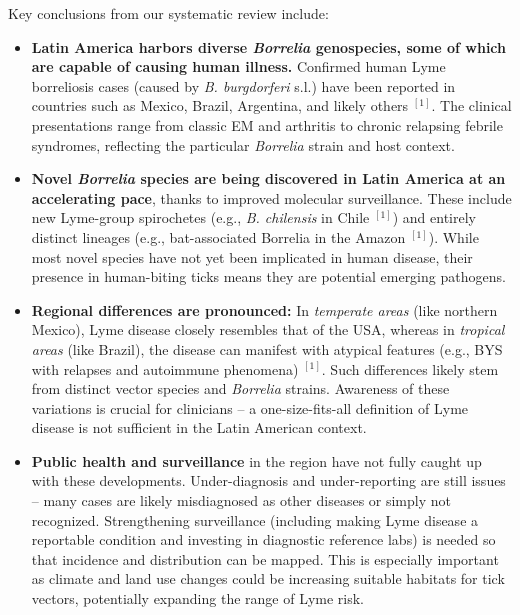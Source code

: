 \documentclass[11pt,letterpaper]{article}
\newcommand{\mycite}[1]{$^{[#1]}$}
\begin{document}
Key conclusions from our systematic review include:

\begin{itemize}[leftmargin=*,itemsep=4pt]
    \item \textbf{Latin America harbors diverse \textit{Borrelia} genospecies, some of which are capable of causing human illness.} Confirmed human Lyme borreliosis cases (caused by \textit{B. burgdorferi} s.l.) have been reported in countries such as Mexico, Brazil, Argentina, and likely others \mycite{1}. The clinical presentations range from classic EM and arthritis to chronic relapsing febrile syndromes, reflecting the particular \textit{Borrelia} strain and host context.

    \item \textbf{Novel \textit{Borrelia} species are being discovered in Latin America at an accelerating pace}, thanks to improved molecular surveillance. These include new Lyme-group spirochetes (e.g., \textit{B. chilensis} in Chile \mycite{1}) and entirely distinct lineages (e.g., bat-associated Borrelia in the Amazon \mycite{1}). While most novel species have not yet been implicated in human disease, their presence in human-biting ticks means they are potential emerging pathogens.

    \item \textbf{Regional differences are pronounced:} In \textit{temperate areas} (like northern Mexico), Lyme disease closely resembles that of the USA, whereas in \textit{tropical areas} (like Brazil), the disease can manifest with atypical features (e.g., BYS with relapses and autoimmune phenomena) \mycite{1}. Such differences likely stem from distinct vector species and \textit{Borrelia} strains. Awareness of these variations is crucial for clinicians – a one-size-fits-all definition of Lyme disease is not sufficient in the Latin American context.

    \item \textbf{Public health and surveillance} in the region have not fully caught up with these developments. Under-diagnosis and under-reporting are still issues – many cases are likely misdiagnosed as other diseases or simply not recognized. Strengthening surveillance (including making Lyme disease a reportable condition and investing in diagnostic reference labs) is needed so that incidence and distribution can be mapped. This is especially important as climate and land use changes could be increasing suitable habitats for tick vectors, potentially expanding the range of Lyme risk.


\end{itemize}
\end{document}

